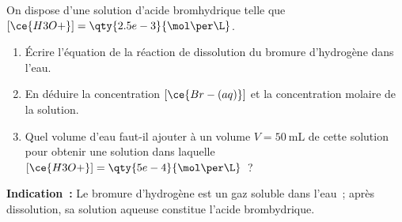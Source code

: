 On dispose d'une solution d'acide bromhydrique telle que
$[\ce{H3O+}]=\qty{2.5e-3}{\mol\per\L}$.
\begin{enumerate}
    \item Écrire l'équation de la réaction de dissolution du bromure d'hydrogène
           dans l'eau.
    \item En déduire la concentration $[\ce{Br-(aq)}]$ et la concentration
          molaire de la solution.
    \item Quel volume d'eau faut-il ajouter à un volume $V=\qty{50}{\mL}$ de
          cette solution pour obtenir une solution dans laquelle
          $[\ce{H3O+}]=\qty{5e-4}{\mol\per\L}$~?
\end{enumerate}
\textbf{Indication~:} Le bromure d'hydrogène  est un gaz soluble dans
l'eau~; après dissolution, sa solution aqueuse constitue l'acide brombydrique.

